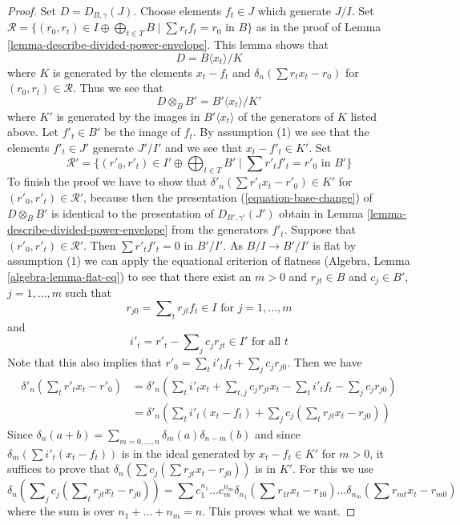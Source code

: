 \documentclass{stacks-project}
\theoremstyle{plain}
\theoremstyle{definition}
\theoremstyle{remark}
\numberwithin{equation}{subsection}
\begin{document}
\begin{proof}
Set $D = D_{B, \gamma}(J)$. Choose elements $f_t \in J$ which generate $J/I$.
Set $\mathcal{R} = \{(r_0, r_t) \in I \oplus \bigoplus\nolimits_{t \in T} B
\mid \sum r_t f_t = r_0 \text{ in }B\}$ as in the proof of
Lemma \ref{lemma-describe-divided-power-envelope}. This lemma shows that
$$
D = B\langle x_t \rangle/ K
$$
where $K$ is generated by the elements $x_t - f_t$ and
$\delta_n(\sum r_t x_t - r_0)$ for $(r_0, r_t) \in \mathcal{R}$.
Thus we see that
\begin{equation}
\label{equation-base-change}
D \otimes_B B' = B'\langle x_t \rangle/K'
\end{equation}
where $K'$ is generated by the images in $B'\langle x_t \rangle$
of the generators of $K$ listed above. Let $f'_t \in B'$ be the image
of $f_t$. By assumption (1) we see that the elements $f'_t \in J'$
generate $J'/I'$ and we see that $x_t - f'_t \in K'$. Set
$$
\mathcal{R}' =
\{(r'_0, r'_t) \in I' \oplus \bigoplus\nolimits_{t \in T} B'
\mid \sum r'_t f'_t = r'_0 \text{ in }B'\}
$$
To finish the proof we have to show that
$\delta'_n(\sum r'_t x_t - r'_0) \in K'$ for
$(r'_0, r'_t) \in \mathcal{R}'$, because then the presentation
(\ref{equation-base-change}) of $D \otimes_B B'$ is identical
to the presentation of $D_{B', \gamma'}(J')$ obtain in
Lemma \ref{lemma-describe-divided-power-envelope} from the generators $f'_t$.
Suppose that $(r'_0, r'_t) \in \mathcal{R}'$. Then
$\sum r'_t f'_t = 0$ in $B'/I'$. As $B/I \to B'/I'$ is flat by
assumption (1) we can apply the equational criterion of flatness
(Algebra, Lemma \ref{algebra-lemma-flat-eq}) to see
that there exist an $m > 0$ and
$r_{jt} \in B$ and $c_j \in B'$, $j = 1, \ldots, m$ such
that
$$
r_{j0} = \sum\nolimits_t r_{jt} f_t  \in I \text{ for } j = 1, \ldots, m
$$
and
$$
i'_t  = r'_t - \sum\nolimits_j c_j r_{jt} \in I' \text{ for all }t
$$
Note that this also implies that
$r'_0 = \sum_t i'_t f_t + \sum_j c_j r_{j0}$.
Then we have
\begin{align*}
\delta'_n(\sum\nolimits_t r'_t x_t  - r'_0)
& =
\delta'_n(
\sum\nolimits_t i'_t x_t +
\sum\nolimits_{t, j} c_j r_{jt} x_t -
\sum\nolimits_t i'_t f_t -
\sum\nolimits_j c_j r_{j0}) \\
& =
\delta'_n(
\sum\nolimits_t i'_t(x_t - f_t) +
\sum\nolimits_j c_j (\sum\nolimits_t r_{jt} x_t  - r_{j0}))
\end{align*}
Since $\delta_n(a + b) = \sum_{m = 0, \ldots, n} \delta_m(a) \delta_{n - m}(b)$
and since $\delta_m(\sum i'_t(x_t - f_t))$ is in the ideal
generated by $x_t - f_t \in K'$ for $m > 0$, it suffices to prove that
$\delta_n(\sum c_j (\sum r_{jt} x_t  - r_{j0}))$ is in $K'$.
For this we use
$$
\delta_n(\sum\nolimits_j c_j (\sum\nolimits_t r_{jt} x_t  - r_{j0}))
=
\sum c_1^{n_1} \ldots c_m^{n_m}
\delta_{n_1}(\sum r_{1t} x_t  - r_{10}) \ldots
\delta_{n_m}(\sum r_{mt} x_t  - r_{m0})
$$
where the sum is over $n_1 + \ldots + n_m = n$. This proves what we want.
\end{proof}
\end{document}
